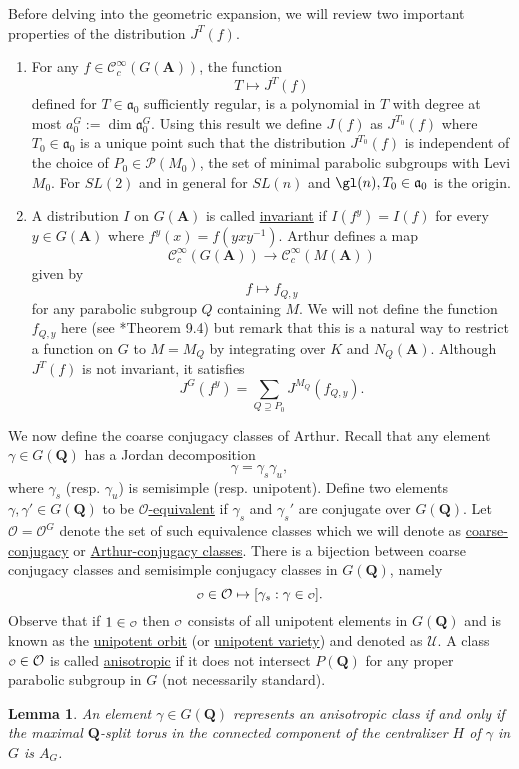 \documentclass[11pt]{amsart}
\def\A{\mathbf A}
\def\Q{\mathbf Q}
\def\CCC{\mathcal C}
\def\PPP{\mathcal P}
\def\O{\mathcal O}
\def\o{\scalebox{0.8}{$\scriptstyle\mathcal{O}$}}
\def\UUU{\mathcal U}
\def\aaa{\mathfrak a}
\def\dim{\operatorname{dim}}
\newtheorem{lemma}[theorem]{Lemma}
\theoremstyle{remark}
\begin{document}
Before delving into the geometric expansion, we will review two important properties of the distribution $J^T(f)$. 
\begin{enumerate}
	\item For any $f \in \CCC_c^\infty(G(\A))$, the function
		\[ T \mapsto J^T(f) \]
		defined for $T \in \aaa_0$ sufficiently regular, is a polynomial in $T$ with degree at most $a_0^G := \dim \aaa_0^G$. Using this result we define $J(f)$ as $J^{T_0}(f)$ where $T_0 \in \aaa_0$ is a unique point such that the distribution $J^{T_0}(f)$ is independent of the choice of $P_0 \in \PPP(M_0)$, the set of minimal parabolic subgroups with Levi $M_0$. For $SL(2)$ and in general for $SL(n)$ and $\gl(n), T_0 \in \aaa_0$ is the origin.
		
	\item A distribution $I$ on $G(\A)$ is called \underline{invariant} if $I(f^y) = I(f)$ for every $y \in G(\A)$ where $f^y(x) = f(yxy^{-1})$. Arthur defines a map
	\[ \CCC_c^\infty(G(\A)) \to \CCC_c^\infty(M(\A)) \]
	given by
	\[ f \mapsto f_{Q, y} \]
	for any parabolic subgroup $Q$ containing $M$. We will not define the function $f_{Q, y}$ here (see \cite{clay}*{Theorem 9.4}) but remark that this is a natural way to restrict a function on $G$ to $M = M_Q$ by integrating over $K$ and $N_Q(\A)$. Although $J^T(f)$ is not invariant, it satisfies
	\[ J^G(f^y) = \sum_{Q \supseteq P_0} J^{M_Q}(f_{Q, y}). \]
\end{enumerate}

We now define the coarse conjugacy classes of Arthur. Recall that any element $\gamma \in G(\Q)$ has a Jordan decomposition
\[ \gamma = \gamma_s \gamma_u, \]
where $\gamma_s$ (resp. $\gamma_u$) is semisimple (resp. unipotent). Define two elements $\gamma, \gamma' \in G(\Q)$ to be \underline{$\O$-equivalent} if $\gamma_s$ and $\gamma_s'$ are conjugate over $G(\Q)$. Let $\O = \O^G$ denote the set of such equivalence classes which we will denote as \underline{coarse-conjugacy} or \underline{Arthur-conjugacy classes}. There is a bijection between coarse conjugacy classes and semisimple conjugacy classes in $G(\Q)$, namely 
\[ \o \in \O \mapsto [\gamma_s : \gamma \in \o ]. \]
Observe that if $1 \in \o$ then $\o$ consists of all unipotent elements in $G(\Q)$ and is known as the \underline{unipotent orbit} (or \underline{unipotent variety}) and denoted as $\UUU$. A class $\o \in \O$ is called \underline{anisotropic} if it does not intersect $P(\Q)$ for any proper parabolic subgroup in $G$ (not necessarily standard). 

\begin{lemma}
	An element $\gamma \in G(\Q)$ represents an anisotropic class if and only if the maximal $\Q$-split torus in the connected component of the centralizer $H$ of $\gamma$ in $G$ is $A_G$. 
\end{lemma}
\end{document}
